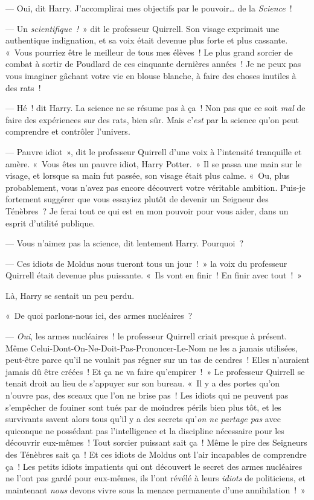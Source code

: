 --- Oui, dit Harry.
J'accomplirai mes objectifs par le pouvoir… de la \emph{Science}~!

--- Un \emph{scientifique~!}~» dit le professeur Quirrell.
Son visage exprimait une authentique indignation, et sa voix était devenue plus forte et plus cassante.
«~Vous pourriez être le meilleur de tous mes élèves~!
Le plus grand sorcier de combat à sortir de Poudlard de ces cinquante dernières années~!
Je ne peux pas vous imaginer gâchant votre vie en blouse blanche, à faire des choses inutiles à des rats~!

--- Hé~! dit Harry.
La science ne se résume pas à ça~!
Non pas que ce soit \emph{mal} de faire des expériences sur des rats, bien sûr.
Mais c'\emph{est} par la science qu'on peut comprendre et contrôler l'univers.

--- Pauvre idiot~», dit le professeur Quirrell d'une voix à l'intensité tranquille et amère.
«~Vous êtes un pauvre idiot, Harry Potter.~»
Il se passa une main sur le visage, et lorsque sa main fut passée, son visage était plus calme.
«~Ou, plus probablement, vous n'avez pas encore découvert votre véritable ambition.
Puis-je fortement suggérer que vous essayiez plutôt de devenir un Seigneur des Ténèbres~?
Je ferai tout ce qui est en mon pouvoir pour vous aider, dans un esprit d'utilité publique.

--- Vous n'aimez pas la science, dit lentement Harry.
Pourquoi~?

--- Ces idiots de Moldus nous tueront tous un jour~!~»
la voix du professeur Quirrell était devenue plus puissante.
«~Ils vont en finir~!
En finir avec tout~!~»

Là, Harry se sentait un peu perdu.

«~De quoi parlons-nous ici, des armes nucléaires~?

--- \emph{Oui}, les armes nucléaires~! le professeur Quirrell criait presque à présent.
Même Celui-Dont-On-Ne-Doit-Pas-Prononcer-Le-Nom ne les a jamais utilisées, peut-être parce qu'il ne voulait pas régner sur un tas de cendres~!
Elles n'auraient jamais dû être créées~!
Et ça ne va faire qu'empirer~!~»
Le professeur Quirrell se tenait droit au lieu de s'appuyer sur son bureau.
«~Il y a des portes qu'on n'ouvre pas, des sceaux que l'on ne brise pas~!
Les idiots qui ne peuvent pas s'empêcher de fouiner sont tués par de moindres périls bien plus tôt, et les survivants savent alors tous qu'il y a des secrets qu'\emph{on ne partage pas} avec quiconque ne possédant pas l'intelligence et la discipline nécessaire pour les découvrir eux-mêmes~!
Tout sorcier puissant sait ça~!
Même le pire des Seigneurs des Ténèbres sait ça~!
Et ces idiots de Moldus ont l'air incapables de comprendre ça~!
Les petits idiots impatients qui ont découvert le secret des armes nucléaires ne l'ont pas gardé pour eux-mêmes, ils l'ont révélé à leurs \emph{idiots} de politiciens, et maintenant \emph{nous} devons vivre sous la menace permanente d'une annihilation~!~»

